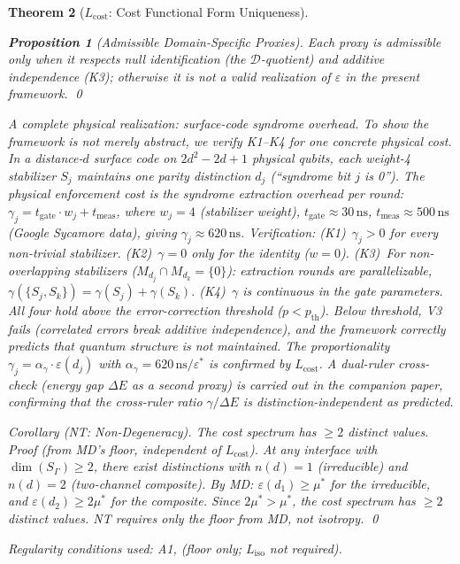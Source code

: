 \documentclass[11pt,a4paper]{article}
\newtheorem{theorem}{Theorem}[section]
\newtheorem{proposition}[theorem]{Proposition}
\theoremstyle{definition}
\newcommand{\eps}{\varepsilon}
\begin{document}
\begin{theorem}[$L_{\mathrm{cost}}$: Cost Functional Form Uniqueness]
\begin{proposition}[Admissible Domain-Specific Proxies]
\noindent Each proxy is admissible only when it respects null identification (the $\mathcal{D}$-quotient) and additive independence (K3); otherwise it is not a valid realization of $\eps$ in the present framework.  \qed

\smallskip\noindent\textit{A complete physical realization: surface-code syndrome overhead.}
To show the framework is not merely abstract, we verify K1--K4 for one concrete physical cost.  In a distance-$d$ surface code on $2d^2 - 2d + 1$ physical qubits, each weight-4 stabilizer $S_j$ maintains one parity distinction $d_j$ (``syndrome bit $j$ is 0'').  The physical enforcement cost is the syndrome extraction overhead per round: $\gamma_j = t_{\mathrm{gate}} \cdot w_j + t_{\mathrm{meas}}$, where $w_j = 4$ (stabilizer weight), $t_{\mathrm{gate}} \approx 30\,\mathrm{ns}$, $t_{\mathrm{meas}} \approx 500\,\mathrm{ns}$ (Google Sycamore data), giving $\gamma_j \approx 620\,\mathrm{ns}$.  Verification: (K1)~$\gamma_j > 0$ for every non-trivial stabilizer.  (K2)~$\gamma = 0$ only for the identity ($w = 0$).  (K3)~For non-overlapping stabilizers ($M_{d_j} \cap M_{d_k} = \{0\}$): extraction rounds are parallelizable, $\gamma(\{S_j, S_k\}) = \gamma(S_j) + \gamma(S_k)$.  (K4)~$\gamma$ is continuous in the gate parameters.  All four hold above the error-correction threshold ($p < p_{\mathrm{th}}$).  Below threshold, V3 fails (correlated errors break additive independence), and the framework correctly predicts that quantum structure is not maintained.  The proportionality $\gamma_j = \alpha_\gamma \cdot \eps(d_j)$ with $\alpha_\gamma = 620\,\mathrm{ns}/\eps^*$ is confirmed by $L_{\mathrm{cost}}$.  A dual-ruler cross-check (energy gap $\Delta E$ as a second proxy) is carried out in the companion paper, confirming that the cross-ruler ratio $\gamma/\Delta E$ is distinction-independent as predicted.
\end{proposition}

\noindent\textit{Corollary (NT: Non-Degeneracy).}  The cost spectrum has $\ge 2$ distinct values.  \textit{Proof (from MD's floor, independent of $L_{\mathrm{cost}}$).}  At any interface with $\dim(S_\Gamma) \ge 2$, there exist distinctions with $n(d) = 1$ (irreducible) and $n(d) = 2$ (two-channel composite).  By MD: $\eps(d_1) \ge \mu^*$ for the irreducible, and $\eps(d_2) \ge 2\mu^*$ for the composite.  Since $2\mu^* > \mu^*$, the cost spectrum has $\ge 2$ distinct values.  NT requires only the floor from MD, not isotropy.  \qed

\noindent\textit{Regularity conditions used:} A1,  (floor only; $L_{\mathrm{iso}}$ not required).
\end{theorem}
\end{document}
